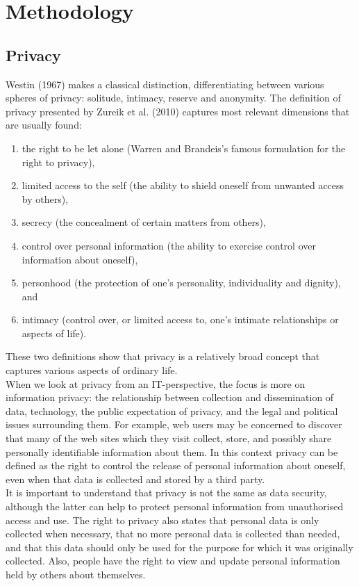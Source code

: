 \section{Methodology}
\label{sec:methodology}
	
\subsection{Privacy}	
Westin (1967) makes a classical distinction, differentiating between various spheres of privacy: solitude, intimacy, reserve and anonymity. The definition of privacy presented by Zureik et al. (2010) captures most relevant dimensions that are usually found:
\begin{enumerate}
	\item the right to be let alone (Warren and Brandeis's famous formulation for the right to privacy),
	\item limited access to the self (the ability to shield oneself from unwanted access by others), 
	\item secrecy (the concealment of certain matters from others),
	\item control over personal information (the ability to exercise control over information about oneself), 
	\item personhood (the protection of one's personality, individuality and dignity), and 
	\item intimacy (control over, or limited access to, one's intimate relationships or aspects of life).
\end{enumerate} 
These two definitions show that privacy is a relatively broad concept that captures various aspects of ordinary life.\\

When we look at privacy from an IT-perspective, the focus is more on information privacy: the relationship between collection and dissemination of data, technology, the public expectation of privacy, and the legal and political issues surrounding them. For example, web users may be concerned to discover that many of the web sites which they visit collect, store, and possibly share personally identifiable information about them. In this context privacy can be defined as the right to control the release of personal information about oneself, even when that data is collected and stored by a third party.\\

It is important to understand that privacy is not the same as data security, although the latter can help to protect personal information from unauthorised access and use. The right to privacy also states that personal data is only collected when necessary, that no more personal data is collected than needed, and that this data should only be used for the purpose for which it was originally collected. Also, people have the right to view and update personal information held by others about themselves.
	
